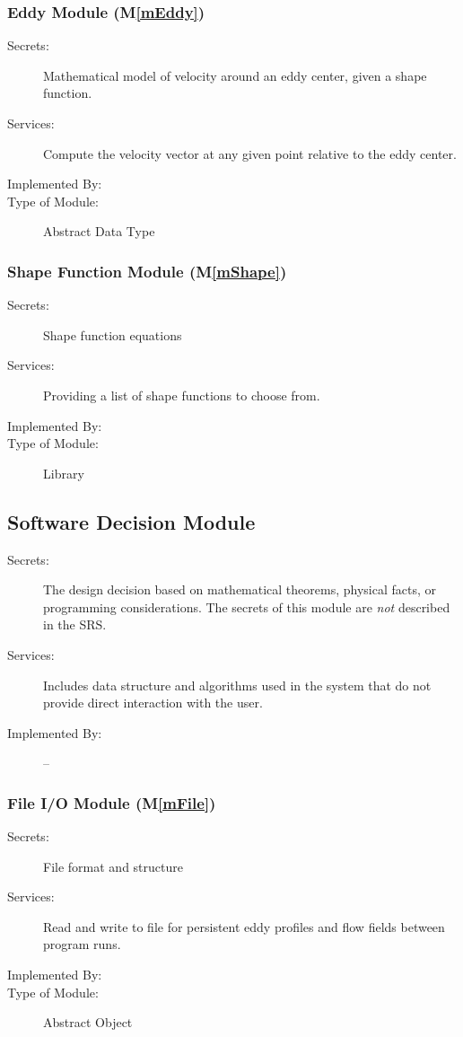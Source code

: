 \documentclass[12pt, titlepage]{article}
\newcommand{\mref}[1]{M\ref{#1}}
\begin{document}
\subsubsection{Eddy Module (\mref{mEddy})}
\begin{description}
\item[Secrets:]Mathematical model of velocity around an eddy center, given a shape function.
\item[Services:]Compute the velocity vector at any given point relative to the eddy center.
\item[Implemented By:] \progname{}
\item[Type of Module:] Abstract Data Type
\end{description}

\subsubsection{Shape Function Module (\mref{mShape})}
\begin{description}
\item[Secrets:]Shape function equations
\item[Services:]Providing a list of shape functions to choose from.
\item[Implemented By:] \progname{}
\item[Type of Module:] Library
\end{description}


\subsection{Software Decision Module}

\begin{description}
\item[Secrets:] The design decision based on mathematical theorems, physical
  facts, or programming considerations. The secrets of this module are
  \emph{not} described in the SRS.
\item[Services:] Includes data structure and algorithms used in the system that
  do not provide direct interaction with the user. 
\item[Implemented By:] --
\end{description}

\subsubsection{File I/O Module (\mref{mFile})}
\begin{description}
\item[Secrets:]File format and structure
\item[Services:]Read and write to file for persistent eddy profiles and flow fields between program runs.
\item[Implemented By:] \progname{}
\item[Type of Module:] Abstract Object
\end{description}
\end{document}
